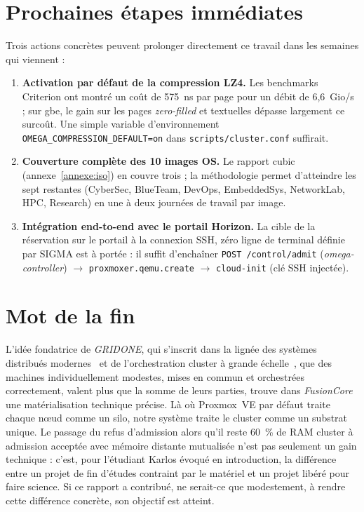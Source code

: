 \section*{Prochaines étapes immédiates}

Trois actions concrètes peuvent prolonger directement ce travail dans les semaines qui viennent :

\begin{enumerate}[leftmargin=*]
    \item \textbf{Activation par défaut de la compression LZ4.} Les benchmarks Criterion ont montré un coût de 575~ns par page pour un débit de 6,6~Gio/s ; sur \acrshort{gbe}, le gain sur les pages \emph{zero-filled} et textuelles dépasse largement ce surcoût. Une simple variable d'environnement \texttt{OMEGA\_COMPRESSION\_DEFAULT=on} dans \texttt{scripts/cluster.conf} suffirait.
    \item \textbf{Couverture complète des 10 images OS.} Le rapport \acrshort{cubic} (annexe~\ref{annexe:iso}) en couvre trois ; la méthodologie permet d'atteindre les sept restantes (CyberSec, BlueTeam, DevOps, EmbeddedSys, NetworkLab, HPC, Research) en une à deux journées de travail par image.
    \item \textbf{Intégration end-to-end avec le portail Horizon.} La cible \og{}de la réservation sur le portail à la connexion SSH, zéro ligne de terminal\fg{} définie par SIGMA est à portée : il suffit d'enchaîner \texttt{POST /control/admit} (\emph{omega-controller}) $\to$ \texttt{proxmoxer.qemu.create} $\to$ \texttt{cloud-init} (clé SSH injectée).
\end{enumerate}

\section*{Mot de la fin}

L'idée fondatrice de \emph{GRIDONE}, qui s'inscrit dans la lignée des systèmes distribués modernes~\cite{kleppmann_ddia} et de l'orchestration cluster à grande échelle~\cite{verma_2015_borg}, que des machines individuellement modestes, mises en commun et orchestrées correctement, valent plus que la somme de leurs parties, trouve dans \emph{FusionCore} une matérialisation technique précise. Là où Proxmox~VE par défaut traite chaque nœud comme un silo, notre système traite le cluster comme un substrat unique. Le passage du \og{}refus d'admission alors qu'il reste 60~\% de RAM cluster\fg{} à \og{}admission acceptée avec mémoire distante mutualisée\fg{} n'est pas seulement un gain technique : c'est, pour l'étudiant Karlos évoqué en introduction, la différence entre un projet de fin d'études contraint par le matériel et un projet libéré pour faire science. Si ce rapport a contribué, ne serait-ce que modestement, à rendre cette différence concrète, son objectif est atteint.
